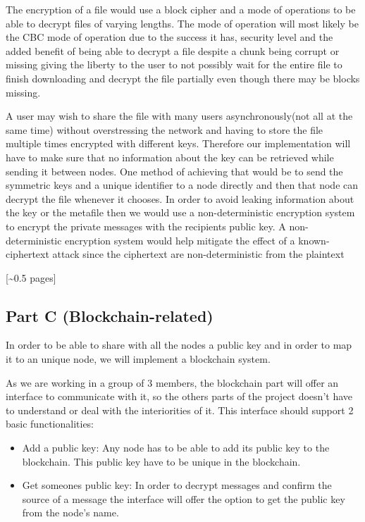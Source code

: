 \documentclass[12pt,a4paper,draft]{article}
\begin{document}
The encryption of  a file would use a block cipher and a mode of operations to be able to decrypt files of varying lengths. The mode of operation will most likely be the CBC mode of operation due to the success it has, security level and the added benefit of being able to decrypt a file despite a chunk being corrupt or missing giving the liberty to the user to not possibly wait for the entire file to finish downloading and decrypt the file partially even though there may be blocks missing. 

A user may wish to share the file with many users asynchronously(not all at the same time) without overstressing the network and having to store the file multiple times encrypted with different keys. Therefore our implementation will have to make sure that no information about the key can be retrieved while sending it between nodes. One method of achieving that would be to send the symmetric keys and a unique identifier to a node directly and then that node can decrypt the file whenever it chooses. In order to avoid leaking information about the key or the metafile then we would use a non-deterministic encryption system to encrypt the private messages with the recipients public key. A non-deterministic encryption system would help mitigate the effect of a known-ciphertext attack since the ciphertext are non-deterministic from the plaintext

[\textasciitilde{}0.5 pages]

\subsection{Part C (Blockchain-related)}

In order to be able to share with all the nodes a public key and in order to map it to an unique node, we will implement a blockchain system. 

As we are working in a group of 3 members, the blockchain part will offer an interface to communicate with it, so the others parts of the project doesn't have to understand or deal with the interiorities of it. This interface should support 2 basic functionalities:

\begin{itemize}
 \item Add a public key: Any node has to be able to add its public key to the blockchain. This public key have to be unique in the blockchain.

 \item Get someones public key: In order to decrypt messages and confirm the source of a message the interface will offer the option to get the public key from the node's name.
\end{itemize}
\end{document}
